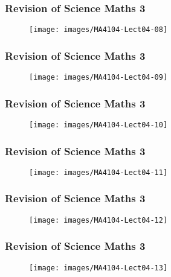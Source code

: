 \documentclass{beamer}
\begin{document}
	\begin{frame}
		\frametitle{Revision of Science Maths 3}
		\begin{figure}
			\centering	
			\texttt{[image: images/MA4104-Lect04-08]}
			
		\end{figure}
	\end{frame}
	\begin{frame}
		\frametitle{Revision of Science Maths 3}
		\begin{figure}
			\centering
			\texttt{[image: images/MA4104-Lect04-09]}
			
		\end{figure}
	\end{frame}
	\begin{frame}
		\frametitle{Revision of Science Maths 3}
		\begin{figure}
			\centering
			\texttt{[image: images/MA4104-Lect04-10]}
			
		\end{figure}
	\end{frame}
	\begin{frame}
		\frametitle{Revision of Science Maths 3}
		\begin{figure}
			\centering
			\texttt{[image: images/MA4104-Lect04-11]}
			
		\end{figure}
	\end{frame}
	\begin{frame}
		\frametitle{Revision of Science Maths 3}
		\begin{figure}
			\centering
			\texttt{[image: images/MA4104-Lect04-12]}
			
		\end{figure}
	\end{frame}
	\begin{frame}
		\frametitle{Revision of Science Maths 3}
		\begin{figure}
			\centering
			\texttt{[image: images/MA4104-Lect04-13]}
			
		\end{figure}
	\end{frame}
\end{document}
